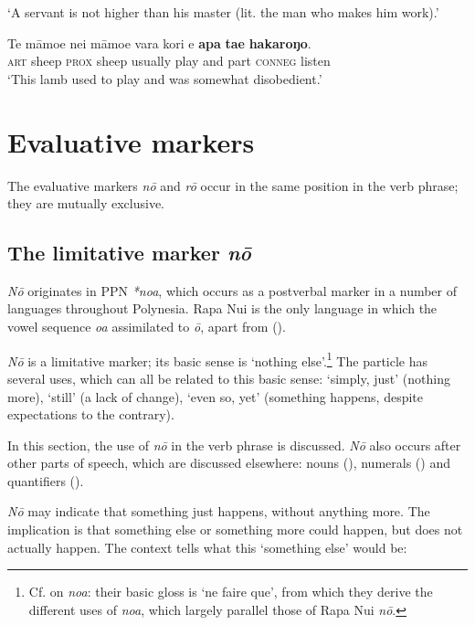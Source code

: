 \glt 
‘A servant is not higher than his master (lit. the man who makes him work).’ \textstyleExampleref{[Mat. 10:24]}
\z

\ea\label{ex:7.101}
\gll Te māmoe nei māmoe vara kori {\ꞌ}e \textbf{{\ꞌ}apa} \textbf{ta{\ꞌ}e} \textbf{hakaroŋo}. \\
\textsc{art} sheep \textsc{prox} sheep usually play and part \textsc{conneg} listen \\

\glt 
‘This lamb used to play and was somewhat disobedient.’ \textstyleExampleref{[R536.009]} 
\z

\section{Evaluative markers}\label{sec:7.4}
The evaluative markers \textit{nō} and \textit{rō} occur in the same position in the verb phrase; they are mutually exclusive. 

\subsection{The limitative marker \textit{nō}}\label{sec:7.4.1}
\textit{Nō} originates in PPN \textit{*noa}, which occurs as a postverbal marker in a number of languages throughout Polynesia. Rapa Nui is the only language in which the vowel sequence \textit{oa} assimilated to \textit{ō}, apart from  (\citealt[100]{ElbertPukui1979}).

\textit{Nō} is a limitative marker; its basic sense is ‘nothing else’.\footnote{\label{fn:345}Cf. \citet[146]{LazardPeltzer2000} on  \textit{noa}: their basic gloss is ‘ne faire que’, from which they derive the different uses of \textit{noa}, which largely parallel those of Rapa Nui \textit{nō}.} The particle has several uses, which can all be related to this basic sense: ‘simply, just’ (nothing more), ‘still’ (a lack of change), ‘even so, yet’ (something happens, despite expectations to the contrary).

In this section, the use of \textit{nō} in the verb phrase is discussed. \textit{Nō} also occurs after other parts of speech, which are discussed elsewhere: nouns (), numerals () and quantifiers ().

\textit{Nō} may indicate that something just happens, without anything more. The implication is that something else or something more could happen, but does not actually happen. The context tells what this ‘something else’ would be:

